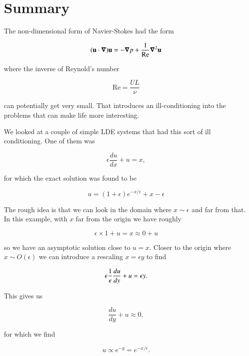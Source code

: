 \section{Summary}

The non-dimensional form of Navier-Stokes had the form

\begin{equation}\label{eqn:continuumFluidsReview:2670}
(\mathbf{u} \cdot \boldsymbol{\nabla}) \mathbf{u} = -\boldsymbol{\nabla} p + \frac{1}{\text{Re}} {\boldsymbol{\nabla}}^2 \mathbf{u}
\end{equation}

where the inverse of Reynold's number

\begin{equation}\label{eqn:continuumFluidsReview:2610}
\text{Re} = \frac{U L}{\nu}
\end{equation}

can potentially get very small.  That introduces an ill-conditioning into the problems that can make life more interesting.

We looked at a couple of simple LDE systems that had this sort of ill conditioning.  One of them was

\begin{equation}\label{eqn:continuumFluidsReview:2630}
\epsilon \frac{du}{dx} + u = x,
\end{equation}

for which the exact solution was found to be

\begin{equation}\label{eqn:continuumFluidsReview:2650}
u = (1 + \epsilon) e^{-x/\epsilon} + x - \epsilon
\end{equation}

The rough idea is that we can look in the domain where $x \sim \epsilon$ and far from that.  In this example, with $x$ far from the origin we have roughly

\begin{equation}\label{eqn:continuumFluidsReview:2690}
\epsilon \times 1 + u = x \approx 0 + u
\end{equation}

so we have an asymptotic solution close to $u = x$.  Closer to the origin where $x \sim O(\epsilon)$ we can introduce a rescaling $x = \epsilon y$ to find

\begin{equation}\label{eqn:continuumFluidsReview:2710}
\epsilon \frac{1}{\epsilon} \frac{du}{dy} + u = \epsilon y.
\end{equation}

This gives us

\begin{equation}\label{eqn:continuumFluidsReview:2730}
\frac{du}{dy} + u \approx 0,
\end{equation}

for which we find 

\begin{equation}\label{eqn:continuumFluidsReview:2750}
u \propto e^{-y} = e^{-x/\epsilon}.
\end{equation}

